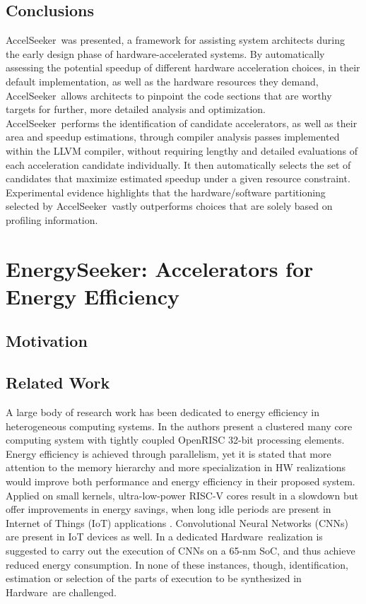 \documentclass[]{usiinfthesis}
\newcommand{\aseeker}{{AccelSeeker}}
\newcommand{\HW}{{Hardware}}
\begin{document}
\subsection{Conclusions}
\label{sec:conclusions_as}

\aseeker\ was presented, a framework for assisting system architects during the early design phase of 
hardware-accelerated systems. By automatically assessing the potential speedup of different hardware 
acceleration choices, in their default implementation, as well as the hardware resources they demand, 
\aseeker\ allows architects to pinpoint the code sections that are worthy targets for further, more 
detailed analysis and optimization.
\aseeker\ performs the identification of candidate accelerators, as well as their area and speedup 
estimations, through compiler analysis passes implemented within the LLVM compiler, without requiring 
lengthy and detailed evaluations of each acceleration candidate individually. It then automatically 
selects the set of candidates that maximize estimated speedup under a given resource constraint. 
Experimental evidence highlights that the hardware/software partitioning selected by \aseeker\ vastly
outperforms choices that are solely based on profiling information.


% 
%
%
%
%

\section{EnergySeeker: Accelerators for Energy Efficiency}

\subsection{Motivation}

\subsection{Related Work}

A large body of research work has been dedicated to energy efficiency in heterogeneous computing
systems. In \cite{MelpignanoJune12} \cite{ContiSep16} the authors present a clustered many core 
computing system with tightly coupled OpenRISC 32-bit processing elements. Energy efficiency is 
achieved through parallelism, yet it is stated that more attention to the memory hierarchy and 
more specialization in HW realizations would improve both performance and energy efficiency in 
their proposed system. Applied on small kernels, ultra-low-power RISC-V cores result in a slowdown 
but offer improvements in energy savings, when long idle periods are present in Internet of 
Things (IoT) applications \cite{SchiavoneSep17}. Convolutional Neural Networks (CNNs) are 
present in IoT devices as well. In \cite{PulliniJan17} a dedicated \HW\ realization is 
suggested to carry out the execution of CNNs on a 65-nm SoC, and thus achieve reduced energy
consumption. In none of these instances, though, identification, estimation or selection of
the parts of execution to be synthesized in \HW\ are challenged.\par
\end{document}
